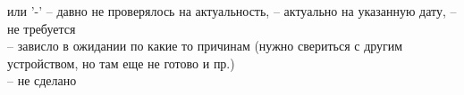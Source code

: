 \pagestyle{fancy}
\fancyhf{}
\renewcommand{\headrulewidth}{1pt}
\rfoot{{\thepage}}
\renewcommand{\footrulewidth}{1pt}


\pagecolor{yellow!5}

\begin{flushleft}

\color{black}
\footnotesize

{\color{olive}\large{\faQuestionCircle}} или '-' -- давно не проверялось на актуальность, {\color{teal}\large{\faPlusSquare}} -- актуально на указанную дату, {\color{cyan}\large{\faBan}} -- не требуется \\ {\color{orange}\large{\faSpinner}} -- зависло в ожидании по какие то причинам (нужно свериться с другим устройством, но там еще не готово и пр.) \\ {\color{red}\large{\faMinusSquare}} -- не сделано



\end{flushleft}

